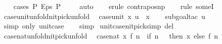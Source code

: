 \begin{isabellebody}
%
\isadelimproof
\ \ %
\endisadelimproof
%
\isatagproof
{}\isamarkupfalse%
\ {\isacharparenleft}{\kern0pt}cases\ {\isachardoublequoteopen}P\ {\isacharparenleft}{\kern0pt}Eps\ P{\isacharparenright}{\kern0pt}{\isachardoublequoteclose}{\isacharparenright}{\kern0pt}\isanewline
\ \ \ \isamarkupfalse%
\ auto\isanewline
\ \ \isamarkupfalse%
\ {\isacharparenleft}{\kern0pt}erule\ contrapos{\isacharunderscore}{\kern0pt}np{\isacharparenright}{\kern0pt}\isanewline
\ \ \isamarkupfalse%
\ {\isacharparenleft}{\kern0pt}rule\ someI{\isacharparenright}{\kern0pt}%
\endisatagproof
{\isafoldproof}%
%
\isadelimproof
\isanewline
%
\endisadelimproof
\isanewline
{}\isamarkupfalse%
\ case{\isacharunderscore}{\kern0pt}unit{\isacharunderscore}{\kern0pt}unfold{\isacharbrackleft}{\kern0pt}nitpick{\isacharunderscore}{\kern0pt}unfold{\isacharbrackright}{\kern0pt}{\isacharcolon}{\kern0pt}\isanewline
\ \ {\isachardoublequoteopen}case{\isacharunderscore}{\kern0pt}unit\ x\ u\ {\isasymequiv}\ x{\isachardoublequoteclose}\isanewline
%
\isadelimproof
\ \ %
\endisadelimproof
%
\isatagproof
{}\isamarkupfalse%
\ {\isacharparenleft}{\kern0pt}subgoal{\isacharunderscore}{\kern0pt}tac\ {\isachardoublequoteopen}u\ {\isacharequal}{\kern0pt}\ {\isacharparenleft}{\kern0pt}{\isacharparenright}{\kern0pt}{\isachardoublequoteclose}{\isacharparenright}{\kern0pt}\isanewline
\ \ \ \isamarkupfalse%
\ {\isacharparenleft}{\kern0pt}simp\ only{\isacharcolon}{\kern0pt}\ unit{\isachardot}{\kern0pt}case{\isacharparenright}{\kern0pt}\isanewline
\ \ \isamarkupfalse%
\ simp%
\endisatagproof
{\isafoldproof}%
%
\isadelimproof
\isanewline
%
\endisadelimproof
\isanewline
{}\isamarkupfalse%
\ unit{\isachardot}{\kern0pt}case{\isacharbrackleft}{\kern0pt}nitpick{\isacharunderscore}{\kern0pt}simp\ del{\isacharbrackright}{\kern0pt}\isanewline
\isanewline
{}\isamarkupfalse%
\ case{\isacharunderscore}{\kern0pt}nat{\isacharunderscore}{\kern0pt}unfold{\isacharbrackleft}{\kern0pt}nitpick{\isacharunderscore}{\kern0pt}unfold{\isacharbrackright}{\kern0pt}{\isacharcolon}{\kern0pt}\isanewline
\ \ {\isachardoublequoteopen}case{\isacharunderscore}{\kern0pt}nat\ x\ f\ n\ {\isasymequiv}\ if\ n\ {\isacharequal}{\kern0pt}\ {}\ then\ x\ else\ f\ {\isacharparenleft}{\kern0pt}n\ {\isacharminus}{\kern0pt}\ {}{\isacharparenright}{\kern0pt}{\isachardoublequoteclose}\isanewline
%
\isadelimproof
\ \ %
\endisadelimproof
%
\isatagproof
{}\isamarkupfalse%

\end{isabellebody}
